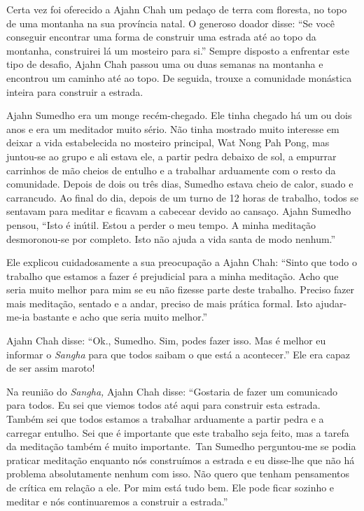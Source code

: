 Certa vez foi oferecido a Ajahn Chah um pedaço de terra com floresta, no
topo de uma montanha na sua província natal. O generoso doador disse:
``Se você conseguir encontrar uma forma de construir uma estrada até ao
topo da montanha, construirei lá um mosteiro para si.'' Sempre disposto
a enfrentar este tipo de desafio, Ajahn Chah passou uma ou duas semanas
na montanha e encontrou um caminho até ao topo. De seguida, trouxe a
comunidade monástica inteira para construir a estrada. ~

Ajahn Sumedho era um monge recém-chegado. Ele tinha chegado há um ou
dois anos e era um meditador muito sério. Não tinha mostrado muito
interesse em deixar a vida estabelecida no mosteiro principal, Wat Nong
Pah Pong, mas juntou-se ao grupo e ali estava ele, a partir pedra
debaixo de sol, a empurrar carrinhos de mão cheios de entulho e a
trabalhar arduamente com o resto da comunidade. Depois de dois ou três
dias, Sumedho estava cheio de calor, suado e carrancudo. Ao final do
dia, depois de um turno de 12 horas de trabalho, todos se sentavam para
meditar e ficavam a cabecear devido ao cansaço. Ajahn Sumedho pensou,
``Isto é inútil. Estou a perder o meu tempo. A minha meditação
desmoronou-se por completo. Isto não ajuda a vida santa de modo
nenhum.''

Ele explicou cuidadosamente a sua preocupação a Ajahn Chah: ``Sinto que
todo o trabalho que estamos a fazer é prejudicial para a minha
meditação. Acho que seria muito melhor para mim se eu não fizesse parte
deste trabalho. Preciso fazer mais meditação, sentado e a andar, preciso
de mais prática formal. Isto ajudar-me-ia bastante e acho que seria
muito melhor.''

Ajahn Chah disse: ``Ok., Sumedho. Sim, podes fazer isso. Mas é melhor eu
informar o \emph{Sangha} para que todos saibam o que está a acontecer.''
Ele era capaz de ser assim maroto!

Na reunião do \emph{Sangha,} Ajahn Chah disse: ``Gostaria de fazer um
comunicado para todos. Eu sei que viemos todos até aqui para construir
esta estrada. Também sei que todos estamos a trabalhar arduamente a
partir pedra e a carregar entulho. Sei que é importante que este
trabalho seja feito, mas a tarefa da meditação também é muito
importante.~Tan Sumedho perguntou-me se podia praticar meditação
enquanto nós construímos a estrada e eu disse-lhe que não há problema
absolutamente nenhum com isso. Não quero que tenham pensamentos de
crítica em relação a ele. Por mim está tudo bem. Ele pode ficar sozinho
e meditar e nós continuaremos a construir a estrada.''

